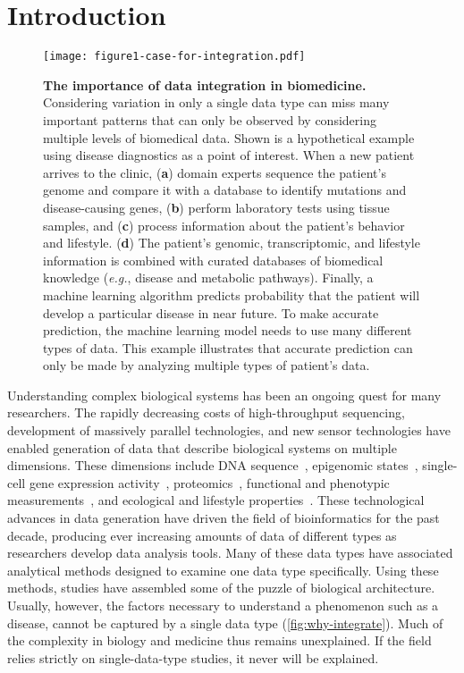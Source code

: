 \documentclass[5p]{elsarticle}
\newcommand{\eg}{\emph{e.g.}\xspace}
\newcommand{\rev}[1]{{\color{black}#1}}
\begin{document}

\section{Introduction}\label{sec:intro}

\begin{figure*}[t]
\centering
\texttt{[image: figure1-case-for-integration.pdf]}
\caption{\textbf{The importance of data integration in biomedicine.} Considering variation in only a single data type can miss many important patterns that can only be observed by  considering multiple levels of biomedical data. Shown is a hypothetical example using disease diagnostics as a point of interest. When a new patient arrives to the clinic, (\textbf{a}) domain experts sequence the patient's genome and compare it with a database to identify mutations and disease-causing genes, (\textbf{b}) perform laboratory tests using tissue samples, and (\textbf{c}) process information about the patient's behavior and lifestyle. (\textbf{d}) The patient's genomic, transcriptomic, and lifestyle information is combined with curated databases of biomedical knowledge (\eg, disease and metabolic pathways). Finally, a machine learning algorithm predicts probability that the patient will develop a particular disease in near future. To make accurate prediction, the machine learning model needs to use many different types of data. This example illustrates that accurate prediction can only be made by analyzing multiple types of patient's data.}
\label{fig:why-integrate}
\end{figure*}

Understanding complex biological systems has been an ongoing quest for many researchers.
The rapidly decreasing costs of high-throughput sequencing, development of massively parallel technologies, and new sensor technologies have enabled \rev{generation of data that describe biological systems on multiple dimensions.}
\rev{These} dimensions include DNA sequence~\cite{Encode2012integrated}, epigenomic stat\rev{es}~\cite{Kundaje2015IntegrativeEpigenomes}, single-cell \rev{gene} expression activity~\cite{Quake2018single}, proteomics~\cite{Wilhelm2014mass}, functional and phenotypic measurements~\cite{Costanzo2016global}, and ecological and lifestyle properties~\cite{Li2017digital}.
These technological advances in data generation have driven the field of bioinformatics for the past decade, producing ever increasing amounts of data \rev{of different types} as researchers develop \rev{data analysis} tools.
Many of these data types have associated analytical methods designed to examine one data type specifically.
Using these methods, \rev{studies} have assembled some of the puzzle of biological architecture.
Usually, however, the factors necessary to understand a phenomenon such as a disease, cannot be captured by a single data type (\autoref{fig:why-integrate}).
Much of the complexity in biology and medicine thus remains unexplained.
If \rev{the field relies} strictly on single-data-type studies, it never will be explained.
\end{document}
